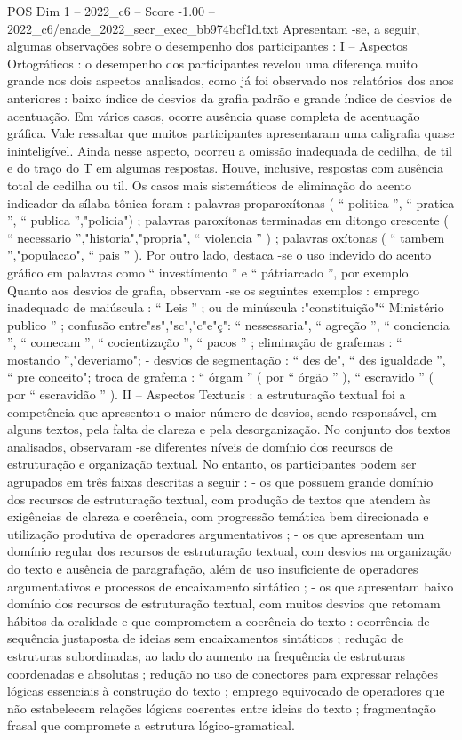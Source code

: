 \begin{textsample}{POS Dim 1 – 2022\_c6 – Score -1.00 – 2022\_c6/enade\_2022\_secr\_exec\_bb974bcf1d.txt}
Apresentam -se, a seguir, algumas observações sobre o desempenho dos participantes : I – Aspectos Ortográficos : o desempenho dos participantes revelou uma diferença muito grande nos dois aspectos analisados, como já foi observado nos relatórios dos anos anteriores : baixo índice de desvios da grafia padrão e grande índice de desvios de acentuação.
Em vários casos, ocorre ausência quase completa de acentuação gráfica.
Vale ressaltar que muitos participantes apresentaram uma caligrafia quase ininteligível.
Ainda nesse aspecto, ocorreu a omissão inadequada de cedilha, de til e do traço do T em algumas respostas.
Houve, inclusive, respostas com ausência total de cedilha ou til.
Os casos mais sistemáticos de eliminação do acento indicador da sílaba tônica foram : palavras proparoxítonas ( “ politica ”, “ pratica ”, “ publica ”,"policia") ; palavras paroxítonas terminadas em ditongo crescente ( “ necessario ”,"historia","propria", “ violencia ” ) ; palavras oxítonas ( “ tambem ”,"populacao", “ pais ” ).
Por outro lado, destaca -se o uso indevido do acento gráfico em palavras como “ investímento ” e “ pátriarcado ”, por exemplo.
Quanto aos desvios de grafia, observam -se os seguintes exemplos : emprego inadequado de maiúscula : “ Leis ” ; ou de minúscula :"constituição"“ Ministério publico ” ; confusão entre"ss","sc","c"e"ç": “ nessessaria", “ agreção ”, “ conciencia ”, “ comecam ”, “ cocientização ”, “ pacos ” ; eliminação de grafemas : “ mostando ”,"deveriamo"; - desvios de segmentação : “ des de", “ des igualdade ”, “ pre conceito"; troca de grafema : “ órgam ” ( por “ órgão ” ), “ escravido ” ( por “ escravidão ” ).
II – Aspectos Textuais : a estruturação textual foi a competência que apresentou o maior número de desvios, sendo responsável, em alguns textos, pela falta de clareza e pela desorganização.
No conjunto dos textos analisados, observaram -se diferentes níveis de domínio dos recursos de estruturação e organização textual.
No entanto, os participantes podem ser agrupados em três faixas descritas a seguir : - os que possuem grande domínio dos recursos de estruturação textual, com produção de textos que atendem às exigências de clareza e coerência, com progressão temática bem direcionada e utilização produtiva de operadores argumentativos ; - os que apresentam um domínio regular dos recursos de estruturação textual, com desvios na organização do texto e ausência de paragrafação, além de uso insuficiente de operadores argumentativos e processos de encaixamento sintático ; - os que apresentam baixo domínio dos recursos de estruturação textual, com muitos desvios que retomam hábitos da oralidade e que comprometem a coerência do texto : ocorrência de sequência justaposta de ideias sem encaixamentos sintáticos ; redução de estruturas subordinadas, ao lado do aumento na frequência de estruturas coordenadas e absolutas ; redução no uso de conectores para expressar relações lógicas essenciais à construção do texto ; emprego equivocado de operadores que não estabelecem relações lógicas coerentes entre ideias do texto ; fragmentação frasal que compromete a estrutura lógico-gramatical.

\end{textsample}
